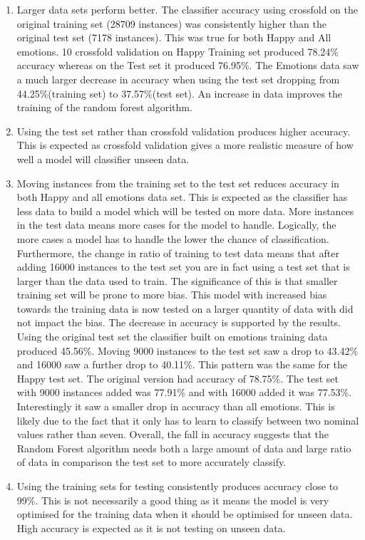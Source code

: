 \begin{enumerate}
  \item Larger data sets perform better. The classifier accuracy using crossfold on the original training set (28709 instances) was consistently higher than the original test set (7178 instances). This was true for both Happy and All emotions. 10 crossfold validation on Happy Training set produced 78.24\% accuracy whereas on the Test set it produced 76.95\%. The Emotions data saw a much larger decrease in accuracy when using the test set dropping from 44.25\%(training set) to 37.57\%(test set). An increase in data improves the training of the random forest algorithm.
  \item Using the test set rather than crossfold validation produces higher accuracy. This is expected as crossfold validation gives a more realistic measure of how well a model will classifier unseen data.
  \item Moving instances from the training set to the test set reduces accuracy in both Happy and all emotions data set. This is expected as the classifier has less data to build a model which will be tested on more data. More instances in the test data means more cases for the model to handle. Logically, the more cases a model has to handle the lower the chance of classification. Furthermore, the change in ratio of training to test data means that after adding 16000 instances to the test set you are in fact using a test set that is larger than the data used to train. The significance of this is that smaller training set will be prone to more bias. This model with increased bias towards the training data is now tested on a larger quantity of data with did not impact the bias. The decrease in accuracy is supported by the results. Using the original test set the classifier built on emotions training data produced 45.56\%. Moving 9000 instances to the test set saw a drop to 43.42\% and 16000 saw a further drop to 40.11\%. This pattern was the same for the Happy test set. The original version had accuracy of 78.75\%. The test set with 9000 instances added was 77.91\% and with 16000 added it was 77.53\%. Interestingly it saw a smaller drop in accuracy than all emotions. This is likely due to the fact that it only has to learn to classify between two nominal values rather than seven. Overall, the fall in accuracy suggests that the Random Forest algorithm needs both a large amount of data and large ratio of data in comparison  the test set to more accurately classify. 
  \item Using the training sets for testing consistently produces accuracy close to 99\%. This is not necessarily a good thing as it means the model is very optimised for the training data when it should be optimised for unseen data. High accuracy is expected as it is not testing on unseen data. 
\end{enumerate}



